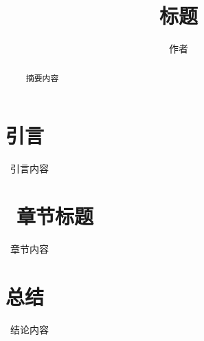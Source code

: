 \documentclass{article}
\title{~标题~}
\author{~作者~}
\begin{document}
\begin{CJK}{UTF8}{gbsn}
  \maketitle

  \renewcommand{\abstractname}{摘要}
  \renewcommand{\figurename}{图}
  \renewcommand{\refname}{参考文献}

  

  \begin{abstract}
    ~摘要内容~
  \end{abstract}

  \newpage
  \section{引言}
  ~引言内容~


  \section{~章节标题~}
  ~章节内容~


  \section{总结}
  ~结论内容~


  

  \end{CJK}
\end{document}
